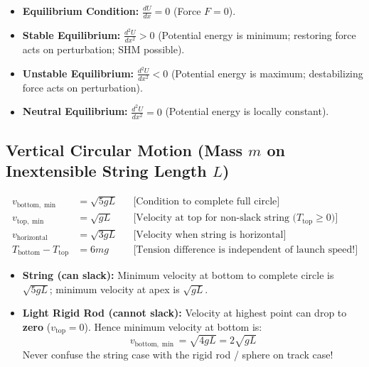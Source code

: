 \documentclass[11pt,a4paper]{article}
\begin{document}
\begin{usecasebox}
\begin{itemize}
  \item \textbf{Equilibrium Condition:} $\frac{dU}{dx} = 0$ (Force $F=0$).
  \item \textbf{Stable Equilibrium:} $\frac{d^2 U}{dx^2} > 0$ (Potential energy is minimum; restoring force acts on perturbation; SHM possible).
  \item \textbf{Unstable Equilibrium:} $\frac{d^2 U}{dx^2} < 0$ (Potential energy is maximum; destabilizing force acts on perturbation).
  \item \textbf{Neutral Equilibrium:} $\frac{d^2 U}{dx^2} = 0$ (Potential energy is locally constant).
\end{itemize}
\end{usecasebox}

\subsection{Vertical Circular Motion (Mass $m$ on Inextensible String Length $L$)}

\begin{formulabox}
\begin{align}
  v_{\text{bottom},\min} &= \sqrt{5gL} && \text{[Condition to complete full circle]} \\
  v_{\text{top},\min} &= \sqrt{gL} && \text{[Velocity at top for non-slack string ($T_{\text{top}} \ge 0$)]} \\
  v_{\text{horizontal}} &= \sqrt{3gL} && \text{[Velocity when string is horizontal]} \\
  T_{\text{bottom}} - T_{\text{top}} &= 6mg && \text{[Tension difference is independent of launch speed!]}
\end{align}
\end{formulabox}

\begin{trapbox}
\begin{itemize}
  \item \textbf{String (can slack):} Minimum velocity at bottom to complete circle is $\sqrt{5gL}$; minimum velocity at apex is $\sqrt{gL}$.
  \item \textbf{Light Rigid Rod (cannot slack):} Velocity at highest point can drop to \textbf{zero} ($v_{\text{top}} = 0$). Hence minimum velocity at bottom is:
  \begin{equation*}
    v_{\text{bottom},\min} = \sqrt{4gL} = 2\sqrt{gL}
  \end{equation*}
  Never confuse the string case with the rigid rod / sphere on track case!
\end{itemize}
\end{trapbox}
\end{document}
